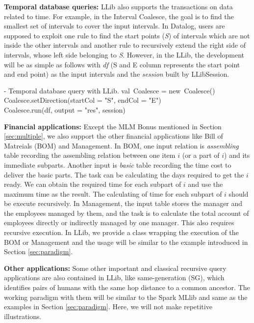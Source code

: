 \eldl



\textbf{Temporal database queries:}
LLib also supports the transactions on data related to time. For example, in the Interval Coalesce, the goal is to find the smallest set of intervals to cover the input intervals. In Datalog, users are supposed to exploit one rule to find the start points (\textit{S}) of intervals which are not inside the other intervals and another rule to recursively extend the right side of intervals, whose left side belonging to \textit{S}. However, in the LLib, the development will be as simple as follows with \textit{df} (S and E column represents the start point and end point) as the input intervals and the \textit{session} built by LLibSession.


\vspace{0.5em}
 - Temporal database query with LLib.
\bldl
val\ Coalesce = new\ Coalesce() \\
Coalesce.setDirection(startCol = "S", endCol = "E") \\
Coalesce.run(df, output = "res", session)
\eldl

\textbf{Financial   applications:}
Except the MLM Bonus mentioned in Section \ref{sec:multiple}, we also support the other financial applications like Bill of Matreials (BOM) \citep{BOM} and  Management. In BOM, one input relation is \textit{assembling} table recording the assembling relation between one item $i$ (or a part of $i$) and its immediate subparts. Another input is \textit{basic} table recording the time cost to deliver the basic parts. The task can be calculating the days required to get  the $i$ ready. We can obtain the required time for each subpart of $i$ and use the maximum time as the result. The calculating of time for each subpart of $i$ should be  execute recursively. In Management, the input table stores the manager and the employees managed by them, and the task is to calculate the total account of employees directly or indirectly managed by one manager. This also requires recursive execution. In LLib, we provide a class wrapping the execution of the BOM or Management and the usage will be similar to the example introduced in Section \ref{sec:paradigm}.

\textbf{Other applications:}
Some other important and classical recursive query applications are also contained in LLib, like same-generation (SG), which identifies pairs of humans with the same hop distance to a common ancestor.  The working paradigm with them will be similar to the Spark MLlib and same as the examples in Section \ref{sec:paradigm}. Here, we will not make repetitive illustrations.
\fi
